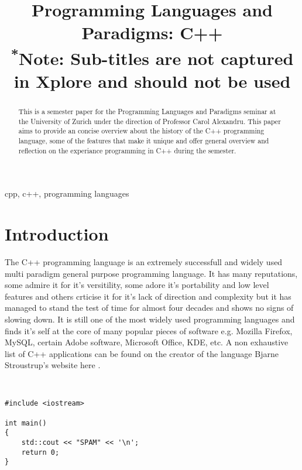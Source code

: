 \documentclass[conference, a4paper]{IEEEtran}
\begin{document}
\title{Programming Languages and Paradigms: C++\\
{\footnotesize \textsuperscript{*}Note: Sub-titles are not captured in Xplore and
should not be used}
}

\author{
}


\maketitle

\begin{abstract}
This is a semester paper for the Programming Languages and Paradigms seminar at the University of Zurich under the direction of Professor Carol Alexandru. This paper aims to provide an concise overview about the history of the C++ programming language, some of the features that make it unique and offer general overview and reflection on the experiance programming in C++ during the semester.\\
\end{abstract}

\begin{IEEEkeywords}
cpp, c++, programming languages
\end{IEEEkeywords}

\section{Introduction}
The C++ programming language is an extremely successfull and widely used multi paradigm general purpose programming language. It has many reputations, some admire it for it's versitility, some adore it's portability and low level features and others crticise it for it's lack of direction and complexity but it has managed to stand the test of time for almost four decades and shows no signs of slowing down. It is still one of the most widely used programming languages and finds it's self at the core of many popular pieces of software e.g. Mozilla Firefox, MySQL, certain Adobe software, Microsoft Office, KDE, etc. A non exhaustive list of C++ applications can be found on the creator of the language Bjarne Stroustrup's website here \cite{cppapplications} .

\begin{verbatim}


#include <iostream>

int main()
{
    std::cout << "SPAM" << '\n';
    return 0;
}

\end{verbatim}
\end{document}
